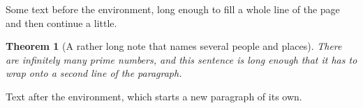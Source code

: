 \documentclass[12pt]{article}
\newtheorem{theorem}{Theorem}
\begin{document}
Some text before the environment, long enough to fill a whole line of the page and then continue a little.
\begin{theorem}[A rather long note that names several people and places]
There are infinitely many prime numbers, and this sentence is long enough that it has to wrap onto a second line of the paragraph.
\end{theorem}
Text after the environment, which starts a new paragraph of its own.
\end{document}
